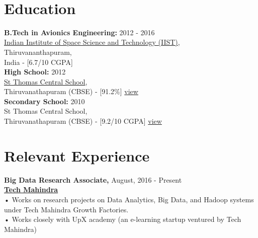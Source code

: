 \documentclass{resume}
\begin{document}


\begin{center}
\small{
		 \
		 \
	}
\end{center}

\smallskip
\begin{multicols}{2}

\section{Education}

\textbf{B.Tech in Avionics Engineering:} \hfill 2012 - 2016 \\
\href{http://iist.ac.in/}{Indian Institute of Space Science and Technology (IIST)},\\
Thiruvananthapuram,\\
India - [6.7/10 CGPA]\\[.05in]
\textbf{High School:} \hfill 2012\\ 
\href{http://www.stthomastvm.edu.in/central/index.aspx}{St Thomas Central School},\\ Thiruvanathapuram (CBSE) - [91.2\%] \href{https://drive.google.com/open?id=0B7qfuVtugGPOZlFKYThZTjNIXzQ}{view}\\[.05in]
\textbf{Secondary School:} \hfill 2010\\  
St Thomas Central School,\\
Thiruvanathapuram (CBSE) - [9.2/10 CGPA] \href{https://drive.google.com/open?id=0B7qfuVtugGPOR0s3eFdjc183QVk}{view}


\section{Relevant Experience}
\textbf{Big Data Research Associate,} \hfill August, 2016 - Present\\
\href{https://techmahindra.com/}{\textbf{Tech Mahindra}}\\
• Works on research projects on Data Analytics, Big Data, and Hadoop systems under Tech Mahindra Growth Factories.\\
• Works closely with UpX academy (an e-learning startup ventured by Tech Mahindra) \\


\end{multicols}
\end{document}
